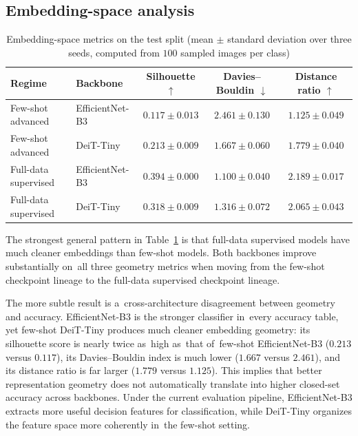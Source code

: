 \documentclass[12pt,a4paper]{article}
\begin{document}
\subsection{Embedding-space analysis}
\label{subsec:embedding-results}

\begin{table}[t!]
\centering
\caption{Embedding-space metrics on the test split (mean $\pm$ standard deviation over three seeds, computed from $100$ sampled images per class)}
\label{tab:embedding-results}
\smallskip
\footnotesize
\begin{tabular}{@{}llccc@{}}
\toprule
\textbf{Regime} & \textbf{Backbone} & \textbf{Silhouette $\uparrow$} & \textbf{Davies--Bouldin $\downarrow$} & \textbf{Distance ratio $\uparrow$} \\
\midrule
Few-shot advanced & EfficientNet-B3 & $0.117 \pm 0.013$ & $2.461 \pm 0.130$ & $1.125 \pm 0.049$ \\
Few-shot advanced & DeiT-Tiny & $0.213 \pm 0.009$ & $1.667 \pm 0.060$ & $1.779 \pm 0.040$ \\
Full-data supervised & EfficientNet-B3 & $\mathbf{0.394 \pm 0.000}$ & $\mathbf{1.100 \pm 0.040}$ & $\mathbf{2.189 \pm 0.017}$ \\
Full-data supervised & DeiT-Tiny & $0.318 \pm 0.009$ & $1.316 \pm 0.072$ & $2.065 \pm 0.043$ \\
\bottomrule
\end{tabular}
\end{table}

The strongest general pattern in Table~\ref{tab:embedding-results} is that full-data supervised models have much cleaner embeddings than few-shot models. Both backbones improve substantially on~all three geometry metrics when moving from the few-shot checkpoint lineage to the full-data supervised checkpoint lineage.

The more subtle result is a~cross-architecture disagreement between geometry and accuracy. EfficientNet-B3 is the stronger classifier in~every accuracy table, yet few-shot DeiT-Tiny produces much cleaner embedding geometry: its silhouette score is nearly twice as~high as~that of~few-shot EfficientNet-B3 ($0.213$ versus $0.117$), its Davies--Bouldin index is much lower ($1.667$ versus $2.461$), and its distance ratio is far larger ($1.779$ versus $1.125$). This implies that better representation geometry does not automatically translate into higher closed-set accuracy across backbones. Under the current evaluation pipeline, EfficientNet-B3 extracts more useful decision features for classification, while DeiT-Tiny organizes the feature space more coherently in~the few-shot setting.
\end{document}

